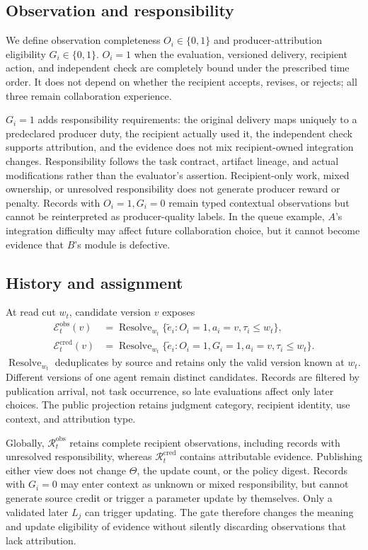 \documentclass[sigconf,anonymous]{aamas}
\begin{document}
\subsection{Observation and responsibility}
We define observation completeness $O_i\in\{0,1\}$ and producer-attribution eligibility $G_i\in\{0,1\}$. $O_i=1$ when the evaluation, versioned delivery, recipient action, and independent check are completely bound under the prescribed time order. It does not depend on whether the recipient accepts, revises, or rejects; all three remain collaboration experience.

$G_i=1$ adds responsibility requirements: the original delivery maps uniquely to a predeclared producer duty, the recipient actually used it, the independent check supports attribution, and the evidence does not mix recipient-owned integration changes. Responsibility follows the task contract, artifact lineage, and actual modifications rather than the evaluator's assertion. Recipient-only work, mixed ownership, or unresolved responsibility does not generate producer reward or penalty. Records with $O_i=1,G_i=0$ remain typed contextual observations but cannot be reinterpreted as producer-quality labels. In the queue example, $A$'s integration difficulty may affect future collaboration choice, but it cannot become evidence that $B$'s module is defective.

\subsection{History and assignment}
At read cut $w_t$, candidate version $v$ exposes
\begin{align}
\mathcal E_t^{\mathrm{obs}}(v)&=\operatorname{Resolve}_{w_t}
 \{\tilde e_i:O_i=1,a_i=v,\tau_i\leq w_t\},\\
\mathcal E_t^{\mathrm{cred}}(v)&=\operatorname{Resolve}_{w_t}
 \{\tilde e_i:O_i=1,G_i=1,a_i=v,\tau_i\leq w_t\}.
\label{eq:views}
\end{align}
$\operatorname{Resolve}_{w_t}$ deduplicates by source and retains only the valid version known at $w_t$. Different versions of one agent remain distinct candidates. Records are filtered by publication arrival, not task occurrence, so late evaluations affect only later choices. The public projection retains judgment category, recipient identity, use context, and attribution type.

Globally, $\mathcal R_t^{\mathrm{obs}}$ retains complete recipient observations, including records with unresolved responsibility, whereas $\mathcal R_t^{\mathrm{cred}}$ contains attributable evidence. Publishing either view does not change $\Theta$, the update count, or the policy digest. Records with $G_i=0$ may enter context as unknown or mixed responsibility, but cannot generate source credit or trigger a parameter update by themselves. Only a validated later $L_j$ can trigger updating. The gate therefore changes the meaning and update eligibility of evidence without silently discarding observations that lack attribution.
\end{document}
